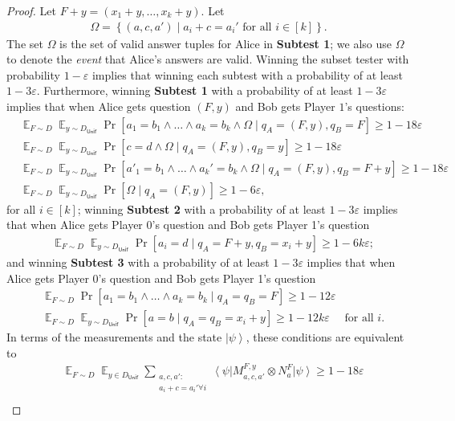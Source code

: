 \documentclass[11pt]{article}
\theoremstyle{plain}
\theoremstyle{definition}
\newcommand {\set} [1] {\ensuremath{ \left\lbrace #1 \right\rbrace }}
\newcommand {\bra} [1] {\ensuremath{ \left\langle #1 \right| }}
\newcommand {\ket} [1] {\ensuremath{ \left| #1 \right\rangle }}
\DeclareMathOperator*{\bigE}{\mathbb{E}}
\newcommand{\ep} {\ensuremath{\varepsilon}}
\newcommand{\x}{\otimes}
\newcommand{\1}{\mathbb{1}} %
\newcommand{\Unif}{\mathsf{Unif}}
\begin{document}
\begin{proof}
Let $F+y = (x_1+y, \ldots, x_k+y)$.
Let 
\begin{align*}
\Omega = \set{( a, c ,a') \mid a_i + c = a_i' \text{ for all } i \in [k]}.
\end{align*}
The set $\Omega$ is the set of valid answer tuples for Alice in \textbf{Subtest 1}; we also use $\Omega$ to denote the \emph{event} that Alice's answers are valid.
Winning the subset tester with probability $1 - \ep$ implies that 
winning each subtest with a probability of at least $1 - 3\ep$.
Furthermore,
winning \textbf{Subtest 1} with a probability of at least $1 - 3\ep$ implies that 
when Alice gets question $(F,y)$ and Bob gets Player $1$'s questions:
\begin{align*}
	&\bigE_{F \sim D} \bigE_{y \sim D_{\Unif}} \Pr[a_1 = b_1 \land \ldots \land a_k = b_k \land \Omega \mid q_A = (F,y), q_B = F] \geq 1 - 18\ep \\
	&\bigE_{F \sim D} \bigE_{y \sim D_{\Unif}} \Pr[ c = d \land \Omega \mid q_A = (F,y) ,q_B = y] \geq 1 - 18 \ep \\
	&\bigE_{F \sim D} \bigE_{y \sim D_{\Unif}} \Pr[ a'_1 = b_1 \land \ldots \land a_k' = b_k\land \Omega \mid q_A = (F,y) ,q_B = F+y] \geq 1 - 18 \ep \\
	&\bigE_{F \sim D} \bigE_{y \sim D_{\Unif}} \Pr[ \Omega \mid q_A = (F,y)] \geq 1 - 6\ep,
\end{align*}
for all $i \in [k]$;
winning \textbf{Subtest 2} with a probability of at least $1 - 3\ep$ implies that 
when Alice gets Player 0's question and Bob gets Player 1's question
\begin{align*}
	&\bigE_{F \sim D} \bigE_{y \sim D_{\Unif}} \Pr[ a_i = d \mid q_A = F+y, q_B = x_i + y] \geq 1 - 6k \ep;
\end{align*}
and winning \textbf{Subtest 3} with a probability of at least $1 - 3\ep$ implies that 
when Alice gets Player 0's question and Bob gets Player 1's question
\begin{align*}
	&\bigE_{F \sim D} \Pr[a_1 = b_1 \land \ldots \land a_k = b_k \mid q_A = q_B =F] \geq 1 - 12 \ep \\
	&\bigE_{F \sim D} \bigE_{y \sim D_{\Unif}} \Pr[ a= b \mid q_A = q_B = x_i + y] \geq 1 - 12k \ep \quad \text{ for all } i.
\end{align*}
In terms of the measurements and the state $\ket{\psi}$, these conditions are equivalent to 
\begin{align*}
	&\bigE_{F \sim D} \bigE_{y \in D_{\Unif}} \sum_{\substack{a,c,a': \\ a_i + c = a_i' \forall i}} \bra{\psi} M^{F,y}_{a, c, a'} \x N^F_a \ket{\psi} \geq 1 - 18 \ep \\

\end{align*}
\end{proof}
\end{document}
